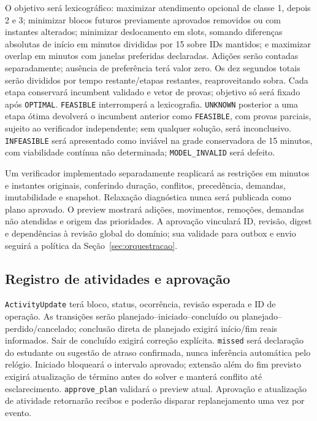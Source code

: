 \documentclass[12pt]{article}
\newcommand{\code}[1]{\nolinkurl{#1}}
\begin{document}
O objetivo será lexicográfico: maximizar atendimento opcional de classe 1, depois 2 e 3; minimizar blocos futuros previamente aprovados removidos ou com instantes alterados; minimizar deslocamento em slots, somando diferenças absolutas de início em minutos divididas por 15 sobre IDs mantidos; e maximizar overlap em minutos com janelas preferidas declaradas. Adições serão contadas separadamente; ausência de preferência terá valor zero. Os dez segundos totais serão divididos por tempo restante/etapas restantes, reaproveitando sobra. Cada etapa conservará incumbent validado e vetor de provas; objetivo só será fixado após \code{OPTIMAL}. \code{FEASIBLE} interromperá a lexicografia. \code{UNKNOWN} posterior a uma etapa ótima devolverá o incumbent anterior como \code{FEASIBLE}, com provas parciais, sujeito ao verificador independente; sem qualquer solução, será inconclusivo. \code{INFEASIBLE} será apresentado como inviável na grade conservadora de 15 minutos, com viabilidade contínua não determinada; \code{MODEL_INVALID} será defeito.

Um verificador implementado separadamente reaplicará as restrições em minutos e instantes originais, conferindo duração, conflitos, precedência, demandas, imutabilidade e snapshot. Relaxação diagnóstica nunca será publicada como plano aprovado. O preview mostrará adições, movimentos, remoções, demandas não atendidas e origem das prioridades. A aprovação vinculará ID, revisão, digest e dependências à revisão global do domínio; sua validade para outbox e envio seguirá a política da Seção~\ref{sec:orquestracao}.

\subsection{Registro de atividades e aprovação}

\code{ActivityUpdate} terá bloco, status, ocorrência, revisão esperada e ID de operação. As transições serão planejado--iniciado--concluído ou planejado--perdido/cancelado; conclusão direta de planejado exigirá início/fim reais informados. Sair de concluído exigirá correção explícita. \code{missed} será declaração do estudante ou sugestão de atraso confirmada, nunca inferência automática pelo relógio. Iniciado bloqueará o intervalo aprovado; extensão além do fim previsto exigirá atualização de término antes do solver e manterá conflito até esclarecimento. \code{approve_plan} validará o preview atual. Aprovação e atualização de atividade retornarão recibos e poderão disparar replanejamento uma vez por evento.
\end{document}
